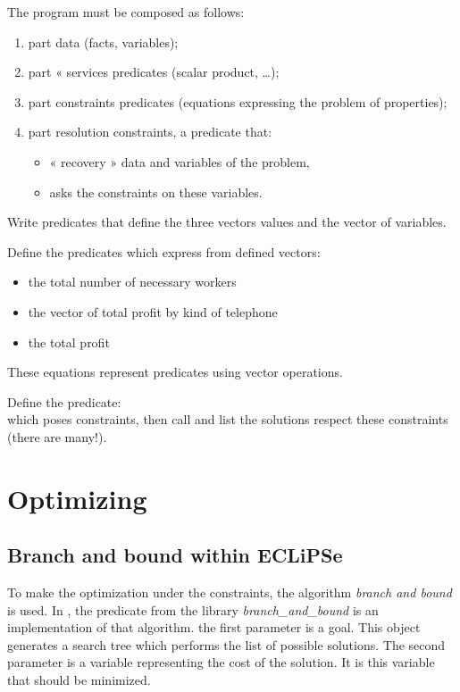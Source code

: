 \noindent The program must be composed as follows:

\begin{enumerate}
\item part data (facts, variables);
\item part « services predicates (scalar product, \dots);
\item part constraints predicates (equations expressing the problem of properties);
\item part resolution constraints, a predicate that:
    \begin{itemize}
    \item « recovery » data and variables of the problem,
    \item asks the constraints on these variables.
    \end{itemize}
\end{enumerate}

\begin{question} \label{TPCPC_Qdeb} 
  Write predicates that define the three vectors
   values and the vector of variables.
\end{question}

\begin{question}
 Define the predicates which express from
   defined vectors:
\begin{itemize} 
  \item the total number of necessary workers
  \item the vector of total profit by kind of telephone
  \item the total profit
\end{itemize} 
These equations represent predicates using vector operations.
\end{question}

\begin{question}
 Define the predicate: \\
   which
   poses constraints, then call and list the solutions
   respect these constraints (there are many!).
\end{question}


\section{Optimizing}

\subsection{Branch and bound within ECLiPSe}
To make the optimization under the constraints, the algorithm \emph{branch and bound} is used. 
\newpage
In \eclipse{}, the predicate  from the library
\emph{branch\_and\_bound} is an implementation of that algorithm. the
first parameter is a goal. This object generates a search tree which performs
the list of possible solutions. The second parameter is a variable representing the
cost of the solution. It is this variable that should be minimized. 

